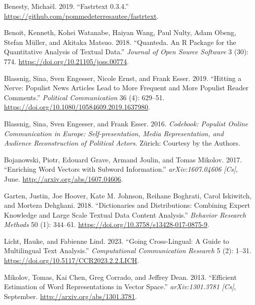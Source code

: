 \documentclass[
]{ccr}
\newlength{\cslhangindent}
\newlength{\cslentryspacingunit} %
\newenvironment{CSLReferences}[2] %
 {%
  \setlength{\parindent}{0pt}
  \ifodd #1
  \let\oldpar\par
  \def\par{\hangindent=\cslhangindent\oldpar}
  \fi
  \setlength{\parskip}{#2\cslentryspacingunit}
 }%
 {}
\begin{document}
\hypertarget{refs}{}
\begin{CSLReferences}{1}{0}
\leavevmode{}%
Benesty, Michaël. 2019. {``Fastrtext 0.3.4.''}
\url{https://github.com/pommedeterresautee/fastrtext}.

\leavevmode{}%
Benoit, Kenneth, Kohei Watanabe, Haiyan Wang, Paul Nulty, Adam Obeng,
Stefan Müller, and Akitaka Matsuo. 2018. {``Quanteda. {An R} Package for
the Quantitative Analysis of Textual Data.''} \emph{Journal of Open
Source Software} 3 (30): 774. \url{https://doi.org/10.21105/joss.00774}.

\leavevmode{}%
Blassnig, Sina, Sven Engesser, Nicole Ernst, and Frank Esser. 2019.
{``Hitting a Nerve: {Populist} News Articles Lead to More Frequent and
More Populist Reader Comments.''} \emph{Political Communication} 36 (4):
629--51. \url{https://doi.org/10.1080/10584609.2019.1637980}.

\leavevmode{}%
Blassnig, Sina, Sven Engesser, and Frank Esser. 2016. \emph{Codebook:
{Populist} Online Communication in {Europe}: {Self-presentation}, Media
Representation, and Audience Reconstruction of Political Actors}.
{Z{ü}rich}: {Courtesy by the Authors}.

\leavevmode{}%
Bojanowski, Piotr, Edouard Grave, Armand Joulin, and Tomas Mikolov.
2017. {``Enriching Word Vectors with Subword Information.''}
\emph{arXiv:1607.04606 {[}Cs{]}}, June.
\url{http://arxiv.org/abs/1607.04606}.

\leavevmode{}%
Garten, Justin, Joe Hoover, Kate M. Johnson, Reihane Boghrati, Carol
Iskiwitch, and Morteza Dehghani. 2018. {``Dictionaries and
Distributions: {Combining} Expert Knowledge and Large Scale Textual Data
Content Analysis.''} \emph{Behavior Research Methods} 50 (1): 344--61.
\url{https://doi.org/10.3758/s13428-017-0875-9}.

\leavevmode{}%
Licht, Hauke, and Fabienne Lind. 2023. {``Going Cross-Lingual: {A} Guide
to Multilingual Text Analysis.''} \emph{Computational Communication
Research} 5 (2): 1--31. \url{https://doi.org/10.5117/CCR2023.2.2.LICH}.

\leavevmode{}%
Mikolov, Tomas, Kai Chen, Greg Corrado, and Jeffrey Dean. 2013.
{``Efficient {Estimation} of {Word Representations} in {Vector
Space}.''} \emph{arXiv:1301.3781 {[}Cs{]}}, September.
\url{http://arxiv.org/abs/1301.3781}.


\end{CSLReferences}
\end{document}
